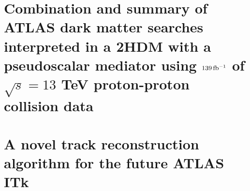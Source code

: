 \documentclass[12pt]{withesis}
\begin{document}

% 
\setcounter{page}{0}
% 
% 
% 

\tableofcontents
\cleardoublepage
{} %
\listoffigures
\cleardoublepage
{} %
\listoftables


\setlength{\parskip}{1em}


\part{Combination and summary of ATLAS dark matter searches interpreted in a 2HDM with a pseudoscalar mediator using $139\, \mbox{fb\(^{-1}\)}$ of $\sqrt{s}=13$ TeV proton-proton collision data}





\part{A novel track reconstruction algorithm for the future ATLAS ITk}



% 



% 
% 

% 
% 


% 
% 
% 
% 




% 
\end{document}
